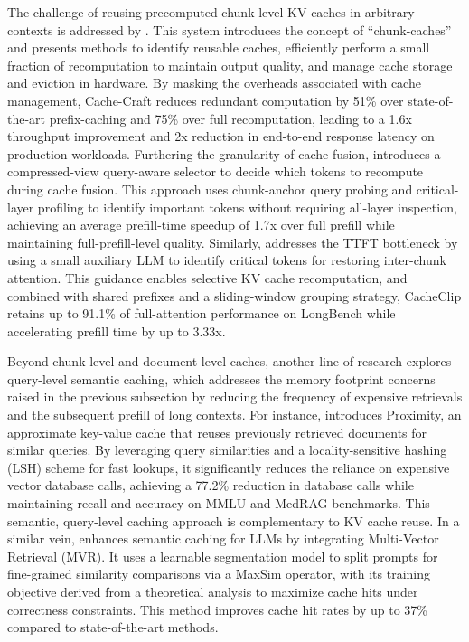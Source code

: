 \documentclass[11pt]{article}
\begin{document}
The challenge of reusing precomputed chunk-level KV caches in arbitrary contexts is addressed by \cite{ref515}. This system introduces the concept of ``chunk-caches'' and presents methods to identify reusable caches, efficiently perform a small fraction of recomputation to maintain output quality, and manage cache storage and eviction in hardware. By masking the overheads associated with cache management, Cache-Craft reduces redundant computation by 51\% over state-of-the-art prefix-caching and 75\% over full recomputation, leading to a 1.6x throughput improvement and 2x reduction in end-to-end response latency on production workloads. Furthering the granularity of cache fusion, \cite{ref518} introduces a compressed-view query-aware selector to decide which tokens to recompute during cache fusion. This approach uses chunk-anchor query probing and critical-layer profiling to identify important tokens without requiring all-layer inspection, achieving an average prefill-time speedup of 1.7x over full prefill while maintaining full-prefill-level quality. Similarly, \cite{ref519} addresses the TTFT bottleneck by using a small auxiliary LLM to identify critical tokens for restoring inter-chunk attention. This guidance enables selective KV cache recomputation, and combined with shared prefixes and a sliding-window grouping strategy, CacheClip retains up to 91.1\% of full-attention performance on LongBench while accelerating prefill time by up to 3.33x.

Beyond chunk-level and document-level caches, another line of research explores query-level semantic caching, which addresses the memory footprint concerns raised in the previous subsection by reducing the frequency of expensive retrievals and the subsequent prefill of long contexts. For instance, \cite{ref520} introduces Proximity, an approximate key-value cache that reuses previously retrieved documents for similar queries. By leveraging query similarities and a locality-sensitive hashing (LSH) scheme for fast lookups, it significantly reduces the reliance on expensive vector database calls, achieving a 77.2\% reduction in database calls while maintaining recall and accuracy on MMLU and MedRAG benchmarks. This semantic, query-level caching approach is complementary to KV cache reuse. In a similar vein, \cite{ref521} enhances semantic caching for LLMs by integrating Multi-Vector Retrieval (MVR). It uses a learnable segmentation model to split prompts for fine-grained similarity comparisons via a MaxSim operator, with its training objective derived from a theoretical analysis to maximize cache hits under correctness constraints. This method improves cache hit rates by up to 37\% compared to state-of-the-art methods.
\end{document}
